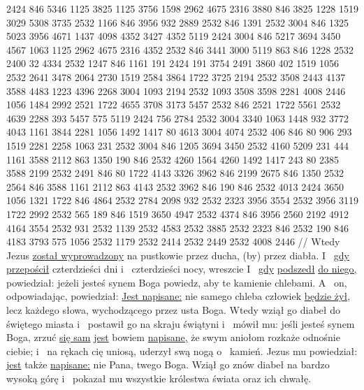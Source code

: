 {} 2424 846 5346 1125 3825 1125 3756 1598 2962 4675 2316
{} 3880 846 3825 1228 1519 3029 5308 3735 2532 1166 846 3956 932 2889 2532 846 1391
{} 2532 3004 846 1325 5023 3956 4671 1437 4098 {} 4352 3427 4352
{} 5119 2424 3004 846 5217 3694 3450 4567 1063 1125 2962 4675 2316 4352 2532 846 3441 3000
{} 5119 863 846 1228 2532 2400 32 4334 2532 1247 846
{} 1161 191 2424 191 3754 2491 3860 402 1519 1056
{} 2532 2641 3478 2064 {} 2730 1519 2584 3864 1722 3725 2194 2532 3508
{} 2443 4137 3588 4483 1223 4396 2268 3004
{} 1093 2194 2532 1093 3508 3598 2281 4008 2446 1056 1484
{} 2992 2521 1722 4655 3708 3173 5457 2532 846 2521 1722 5561 2532 4639 2288 393 5457
{} 575 5119 2424 756 2784 2532 3004 3340 1063 1448 932 3772
{} 4043 1161 3844 2281 1056 1492 1417 80 4613 3004 4074 2532 406 846 80 906 293 1519 2281 2258 1063 231
{} 2532 3004 846 1205 3694 3450 2532 4160 5209 231 444
{} 1161 3588 2112 863 1350 190 846
{} 2532 4260 1564 4260 1492 1417 243 80 2385 {} 3588 2199 2532 2491 846 80 {} 1722 4143 3326 3962 846 2199 2675 846 1350 2532 2564 846
{} 3588 1161 2112 863 4143 2532 3962 846 190 846
{} 2532 4013 2424 3650 1056 1321 1722 846 4864 2532 2784 2098 932 2532 2323 3956 3554 2532 3956 3119 1722 2992
{} 2532 565 189 846 1519 3650 4947 2532 4374 846 3956 2560 2192 4912 4164 3554 2532 931 2532 1139 2532 4583 2532 3885 2532 2323 846
{} 2532 190 846 4183 3793 575 1056 2532 1179 2532 2414 2532 2449 2532 4008 2446
//
\glb
 Wtedy Jezus \underline{został wyprowadzony} na pustkowie przez ducha, (by)  przez diabła.
 I~ \underline{gdy przepościł} czterdzieści dni i~ czterdzieści nocy, wreszcie 
 I~ \underline{gdy}  \underline{podszedł} \underline{do niego,} powiedział: jeżeli jesteś synem Boga powiedz, aby te kamienie  chlebami.
 A~ on, odpowiadając, powiedział: \underline{Jest napisane:} nie  samego chleba człowiek \underline{będzie żył,} lecz  każdego słowa, wychodzącego przez usta Boga.
 Wtedy wziął go diabeł do świętego miasta i~ postawił go na skraju świątyni
 i~ mówił mu: jeśli jesteś synem Boga, zrzuć \underline{się sam}  \underline{jest} bowiem \underline{napisane,} że swym aniołom rozkaże odnośnie ciebie; i~ na rękach cię uniosą,  uderzył swą nogą o~ kamień.
 Jezus mu powiedział: \underline{jest} także \underline{napisane:} nie  Pana, twego Boga.
 Wziął go znów diabeł na bardzo wysoką górę i~ pokazał mu wszystkie królestwa świata oraz ich chwałę.

